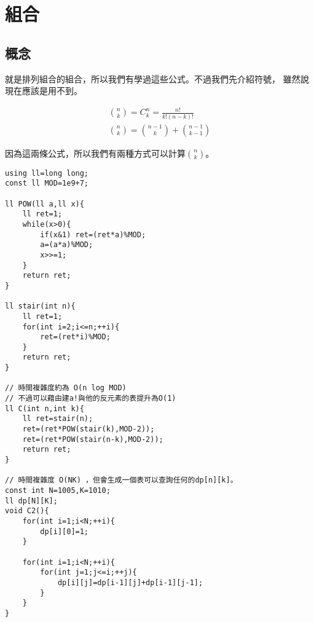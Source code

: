\section{組合}
    \subsection{概念}
    就是排列組合的組合，所以我們有學過這些公式。不過我們先介紹符號，
    雖然說現在應該是用不到。

    \begin{align}
        \binom{n}{k}=C^{n}_{k}= \frac{n!}{k!(n-k)!} \\
        \binom{n}{k}=\binom{n-1}{k}+\binom{n-1}{k-1}
    \end{align}

    因為這兩條公式，所以我們有兩種方式可以計算$\binom{n}{k}$。

\begin{lstlisting}[caption=計算$\binom{n}{k}$]
using ll=long long;
const ll MOD=1e9+7;

ll POW(ll a,ll x){
    ll ret=1;
    while(x>0){
        if(x&1) ret=(ret*a)%MOD;
        a=(a*a)%MOD;
        x>>=1;
    }
    return ret;
}

ll stair(int n){
    ll ret=1;
    for(int i=2;i<=n;++i){
        ret=(ret*i)%MOD;
    }
    return ret;
}

// 時間複雜度約為 O(n log MOD)
// 不過可以藉由建a!與他的反元素的表提升為O(1)
ll C(int n,int k){
    ll ret=stair(n);
    ret=(ret*POW(stair(k),MOD-2));
    ret=(ret*POW(stair(n-k),MOD-2));
    return ret;
}

// 時間複雜度 O(NK) ，但會生成一個表可以查詢任何的dp[n][k]。
const int N=1005,K=1010;
ll dp[N][K];
void C2(){
    for(int i=1;i<N;++i){
        dp[i][0]=1;
    }

    for(int i=1;i<N;++i){
        for(int j=1;j<=i;++j){
            dp[i][j]=dp[i-1][j]+dp[i-1][j-1];
        }
    }
}
\end{lstlisting}

